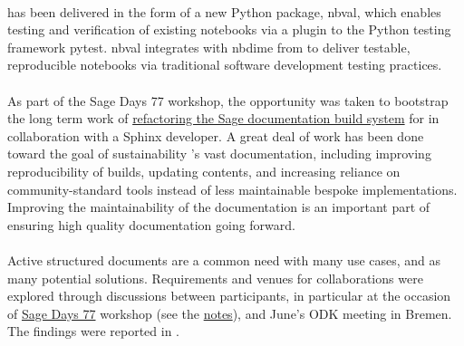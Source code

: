 \documentclass{deliverablereport}
\begin{document}
\paragraph{}

 has been delivered in the form of a new Python package, nbval,
which enables testing and verification of existing notebooks via a plugin to the Python testing
framework pytest. nbval integrates with nbdime from  to deliver
testable, reproducible notebooks via traditional software development testing practices.

\paragraph{}

As part of the Sage Days 77 workshop, the opportunity was taken to bootstrap the long term work of
\href{https://wiki.sagemath.org/days77/documentation}{refactoring the Sage documentation build
system} for  in collaboration with a Sphinx developer. A great deal
of work has been done toward the goal of sustainability \Sage's vast documentation, including
improving reproducibility of builds, updating contents, and increasing reliance on
community-standard tools instead of less maintainable bespoke implementations. Improving the maintainability of the \Sage documentation is an important part of ensuring high quality documentation going forward.


\paragraph{}

Active structured documents are a common need with many use cases, and as many potential solutions.
Requirements and venues for collaborations were explored through discussions between participants,
in particular at the occasion of \href{https://wiki.sagemath.org/days77/}{Sage Days 77} workshop
(see the \href{https://wiki.sagemath.org/days77/live-structured-documents}{notes}), and June's ODK
meeting in Bremen. The findings were reported in .
\end{document}
